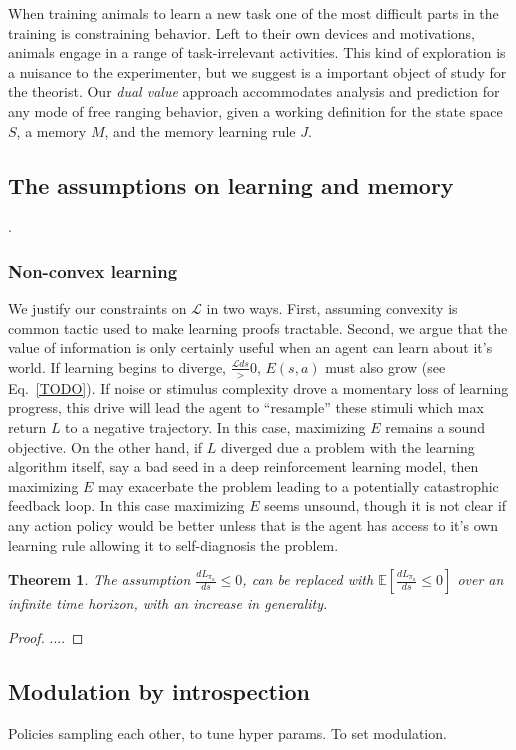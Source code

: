 \documentclass[9pt,twocolumn,twoside]{pnas-new}
\newtheorem{theorem}{Theorem}
\begin{document}
When training animals to learn a new task one of the most difficult parts in the training is constraining behavior. Left to their own devices and motivations, animals engage in a range of task-irrelevant activities. This kind of exploration is a nuisance to the experimenter, but we suggest is a important object of study for the theorist. Our \textit{dual value} approach accommodates analysis and prediction for any mode of free ranging behavior, given a working definition for the state space $S$, a memory $M$, and the memory learning rule $J$.

\subsection*{The assumptions on learning and memory}.
\subsubsection{Non-convex learning}
We justify our constraints on $\mathcal{L}$ in two ways. First, assuming convexity is common tactic used to make learning proofs tractable. Second, we argue that the value of information is only certainly useful when an agent can learn about it's world. If learning begins to diverge, $\frac{\mathcal{L}{ds}} > 0$, $E(s, a)$ must also grow (see Eq.~\ref{TODO}). If noise or stimulus complexity drove a momentary loss of learning progress, this drive will lead the agent to ``resample'' these stimuli which max return $L$ to a negative trajectory. In this case, maximizing $E$ remains a sound objective. On the other hand, if $L$ diverged due a problem with the learning algorithm itself, say a bad seed in a deep reinforcement learning model, then maximizing $E$ may exacerbate the problem leading to a potentially catastrophic feedback loop. In this case maximizing $E$ seems unsound, though it is not clear if any action policy would be better unless that is the agent has access to it's own learning rule allowing it to self-diagnosis the problem.

\begin{theorem}
    The assumption $\frac{dL_{\pi_{a}}}{ds} \leq 0$, can be replaced with $\mathbb{E} [\frac{dL_{\pi_{a}}}{ds} \leq 0]$ over an infinite time horizon, with an increase in generality.
\end{theorem}
\begin{proof}
....
\end{proof}


\subsection{Modulation by introspection}
Policies sampling each other, to tune hyper params. To set modulation.
\end{document}
